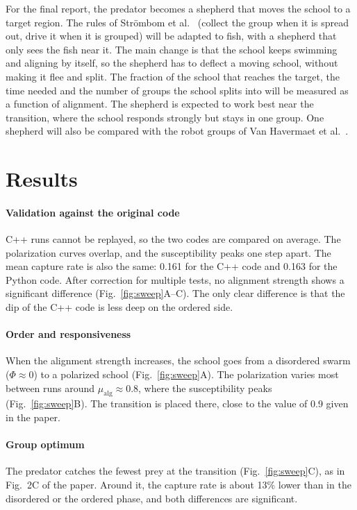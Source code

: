 \documentclass[9pt,twoside]{pnas-new}
\begin{document}
For the final report, the predator becomes a shepherd that moves the school to a target region. The
rules of Str\"ombom et al.~\cite{strombom2014} (collect the group when it is spread out, drive it
when it is grouped) will be adapted to fish, with a shepherd that only sees the fish near it. The main change is that the school keeps swimming and
aligning by itself, so the shepherd has to deflect a moving school, without making it flee and split.
The fraction of the school that reaches the target, the time needed and the number of groups the
school splits into will be measured as a function of alignment. The shepherd is expected to work best near the
transition, where the school responds strongly but stays in one group. One shepherd will also be compared
with the robot groups of Van Havermaet et al.~\cite{vanhavermaet2024}.


\section*{Results}

\paragraph*{Validation against the original code}
C++ runs cannot be replayed, so the two codes are compared on average. The polarization
curves overlap, and the susceptibility peaks one step apart. The mean capture rate is also the same:
0.161 for the C++ code and 0.163 for the Python code. After correction for multiple tests, no
alignment strength shows a significant difference (Fig.~\ref{fig:sweep}A--C).
The only clear difference is that the dip of the C++ code is less deep on the ordered side.

\paragraph*{Order and responsiveness}
When the alignment strength increases, the school goes from a disordered swarm ($\Phi \approx 0$)
to a polarized school (Fig.~\ref{fig:sweep}A). The polarization varies most between runs around
$\mu_{\mathrm{alg}} \approx 0.8$, where the susceptibility peaks (Fig.~\ref{fig:sweep}B). The
transition is placed there, close to the value of 0.9 given in the paper.

\paragraph*{Group optimum}
The predator catches the fewest prey at the transition (Fig.~\ref{fig:sweep}C), as in Fig.~2C of
the paper. Around it, the capture rate is about 13\% lower than in the disordered
or the ordered phase, and both differences are significant.
\end{document}
